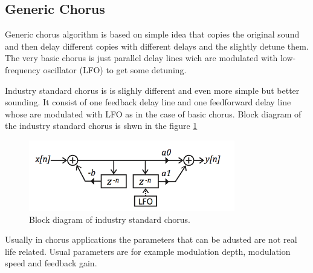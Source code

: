 \subsection{Generic Chorus}

Generic chorus algorithm is based on simple idea that copies the original sound and then delay
different copies with different delays and the slightly detune them. The very basic chorus is just
parallel delay lines wich are modulated with low-frequency oscillator (LFO) to get some detuning.

Industry standard chorus is is slighly different and even more simple but better sounding. It consist
of one feedback delay line and one feedforward delay line whose are modulated with LFO as in the 
case of basic chorus. Block diagram of the industry standard chorus is shwn in the figure \ref{fig_inds}
\begin{figure}[ht]
\centering
\includegraphics[width = 9cm]{industryStd.png}
\caption{Block diagram of industry standard chorus. \cite{dudas}}
\label{fig_inds}
\end{figure} 

Usually in chorus applications the parameters that can be adusted are not real life related.
Usual parameters are for example modulation depth, modulation speed and feedback gain.
